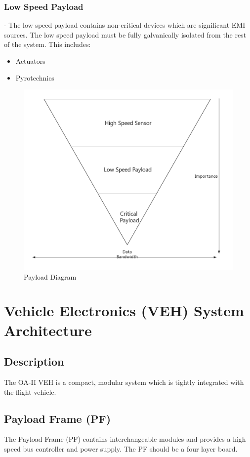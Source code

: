 \documentclass[12pt,article]{memoir}
\begin{document}
\subsection{Low Speed Payload} - The low speed payload contains non-critical devices which are significant EMI sources. The low speed payload must be fully galvanically isolated from the rest of the system. This includes:
\begin{itemize}
\item Actuators
\item Pyrotechnics
\end{itemize}
\begin{figure}[htp]
\includegraphics[width=\textwidth]{ES00002_payloadCata.png}
 \caption{Payload Diagram}	
\end{figure}
\clearpage

\chapter{Vehicle Electronics (VEH) System Architecture}
\section{Description}
The OA-II VEH is a compact, modular system which is tightly integrated with the flight vehicle.
\section{Payload Frame (PF)}
The Payload Frame (PF) contains interchangeable modules and provides a high speed bus controller and power supply. The PF should be a four layer board.
\end{document}
